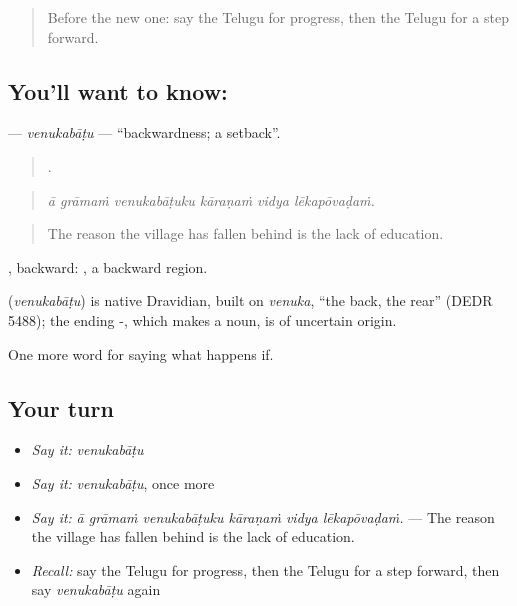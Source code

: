 \label{lesson:TE-C429-venukabatu}



\begin{quote}
Before the new one: say the Telugu for progress, then the Telugu for a step forward.
\end{quote}

\subsection*{You'll want to know: }
\textbf{} — \emph{venukabāṭu} — \textquotedblleft{}backwardness; a setback\textquotedblright{}.

\begin{quote}
     .
\end{quote}

\begin{quote}
\emph{ā grāmaṁ venukabāṭuku kāraṇaṁ vidya lēkapōvaḍaṁ.}
\end{quote}

\begin{quote}
The reason the village has fallen behind is the lack of education.
\end{quote}

, backward:  , a backward region.

\begin{cousinweb}
\textbf{} (\emph{venukabāṭu}) is native Dravidian, built on \emph{venuka}, \textquotedblleft{}the back, the rear\textquotedblright{} (DEDR 5488); the ending -, which makes a noun, is of uncertain origin.
\end{cousinweb}

\begin{grammarlens}[title={What you've built}]
One more word for saying what happens if.
\end{grammarlens}

\subsection*{Your turn}
\begin{itemize}
\raggedright
  \item \emph{Say it:} \emph{venukabāṭu}
  \item \emph{Say it:} \emph{venukabāṭu}, once more
  \item \emph{Say it:} \emph{ā grāmaṁ venukabāṭuku kāraṇaṁ vidya lēkapōvaḍaṁ.} — The reason the village has fallen behind is the lack of education.
  \item \emph{Recall:} say the Telugu for progress, then the Telugu for a step forward, then say \emph{venukabāṭu} again
\end{itemize}

